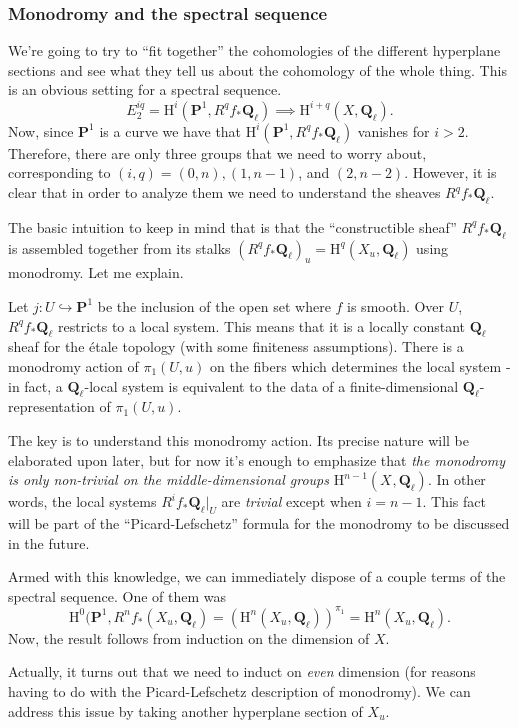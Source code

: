\documentclass[letterpaper,11pt]{article}
\newcommand{\Q}{\mathbf{Q}}
\newcommand{\PS}{\mathbf{P}}
\DeclareMathOperator{\et}{\acute{e}t}
\newcommand{\mrm}[1]{\mathrm{#1}}
\begin{document}
\subsubsection{Monodromy and the spectral sequence}


We're going to try to ``fit together'' the cohomologies of the different hyperplane sections and see what they tell us about the cohomology of the whole thing. This is an obvious setting for a spectral sequence. 
\[
E_2^{iq} = \mrm{H}^i(\PS^1, R^qf_* \Q_{\ell}) \implies \mrm{H}^{i+q}(X, \Q_{\ell}). 
\]
Now, since $\PS^1$ is a curve we have that $\mrm{H}^i(\PS^1, R^q f_* \Q_{\ell})$ vanishes for $i > 2$. Therefore, there are only three groups that we need to worry about, corresponding to $(i,q) = (0,n), (1,n-1)$, and $(2,n-2)$. However, it is clear that in order to analyze them we need to understand the sheaves $R^qf_* \Q_{\ell}$. 

The basic intuition to keep in mind that is that the ``constructible sheaf'' $R^qf_* \Q_{\ell}$ is assembled together from its stalks $(R^q f_* \Q_{\ell})_u = \mrm{H}^q(X_u, \Q_{\ell})$ using monodromy. Let me explain. 

Let $j \colon U \hookrightarrow \PS^1$ be the inclusion of the open set where $f$ is smooth. Over $U$, $R^qf_* \Q_{\ell}$ restricts to a local system. This means that it is a locally constant $\Q_{\ell}$ sheaf for the \'{e}tale topology (with some finiteness assumptions). There is a monodromy action of $\pi_1(U, u)$ on the fibers which determines the local system - in fact, a $\Q_{\ell}$-local system is equivalent to the data of a finite-dimensional $\Q_{\ell}$-representation of $\pi_1(U,u)$. 

The key is to understand this monodromy action. Its precise nature will be elaborated upon later, but for now it's enough to emphasize that \emph{the monodromy is only non-trivial on the middle-dimensional groups} $\mrm{H}^{n-1}(X_{\et}, \Q_{\ell})$. In other words, the local systems $R^{i}f_* \Q_{\ell}|_U$ are \emph{trivial} except when $i=n-1$. This fact will be part of the ``Picard-Lefschetz'' formula for the monodromy to be discussed in the future. 

Armed with this knowledge, we can immediately dispose of a couple terms of the spectral sequence. One of them was 
\[
\mrm{H}^0(\PS^1, R^n f_* (X_u, \Q_{\ell}) = (\mrm{H}^{n}(X_u, \Q_{\ell}))^{\pi_1} = \mrm{H}^{n}(X_u, \Q_{\ell}).
\]
Now, the result follows from induction on the dimension of $X$. 

\begin{remark}
Actually, it turns out that we need to induct on \emph{even} dimension (for reasons having to do with the Picard-Lefschetz description of monodromy). We can address this issue by taking another hyperplane section of $X_u$.
\end{remark}
\end{document}
